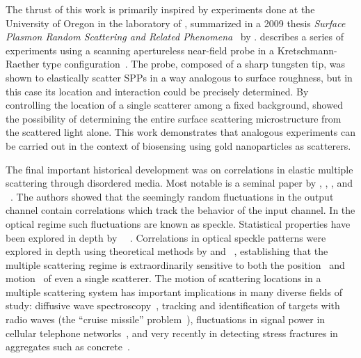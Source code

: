 The thrust of this work is primarily inspired by experiments done at the
University of Oregon in the laboratory of , summarized in a 2009
thesis \textit{Surface Plasmon Random Scattering and Related
Phenomena}~\cite{schumann2009surface} by .  
describes a series of experiments using a scanning apertureless near-field
probe in a Kretschmann-Raether type configuration~\cite{kim1995scanning}.  The
probe, composed of a sharp tungsten tip, was shown to elastically scatter SPPs
in a way analogous to surface roughness, but in this case its location and
interaction could be precisely determined.  By controlling the location of
a single scatterer among a fixed background,  showed the
possibility of determining the entire surface scattering microstructure from
the scattered light alone.  This work demonstrates that analogous experiments
can be carried out in the context of biosensing using gold nanoparticles as
scatterers.

The final important historical development was on correlations in elastic
multiple scattering through disordered media.  Most notable is a seminal paper
by , , , and
~\cite{feng1988correlations}.  The authors showed that the
seemingly random fluctuations in the output channel contain correlations which
track the behavior of the input channel.  In the optical regime such
fluctuations are known as speckle.  Statistical properties have been explored
in depth by
~\cite{goodman2007speckle}~\cite{goodman1975statistical}.
Correlations in optical speckle patterns were explored in depth using
theoretical methods by  and
~\cite{berkovits1994correlations}, establishing that the multiple
scattering regime is extraordinarily sensitive to both the
position~\cite{berkovits1990theory} and motion~\cite{berkovits1991sensitivity}
of even a single scatterer.  The motion of scattering locations in a multiple
scattering system has important implications in many diverse fields of study:
diffusive wave spectroscopy~\cite{pine1988diffusing}, tracking and
identification of targets with radio waves (the ``cruise missile''
problem~\cite{atkins1991neural}), fluctuations in signal power in cellular
telephone networks~\cite{abdi2001estimation}, and very recently in detecting
stress fractures in aggregates such as concrete~\cite{larose2010locating}.
